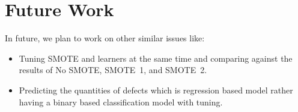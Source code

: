 \documentclass[sigconf,review, anonymous]{acmart}
\newcommand{\bi}{\begin{itemize}[leftmargin=0.4cm]}
\newcommand{\ei}{\end{itemize}}
\theoremstyle{break}
\begin{document}
\section{Future Work}
\label{sect:future}
In future, we plan to work on other similar issues like:
\bi
 \item Tuning SMOTE and learners at the same time and comparing against the results of No SMOTE, SMOTE~1, and SMOTE~2.
 \item Predicting the quantities of defects which is regression based model rather having a binary based classification model with tuning.
\ei

\balance


\medskip

\end{document}
